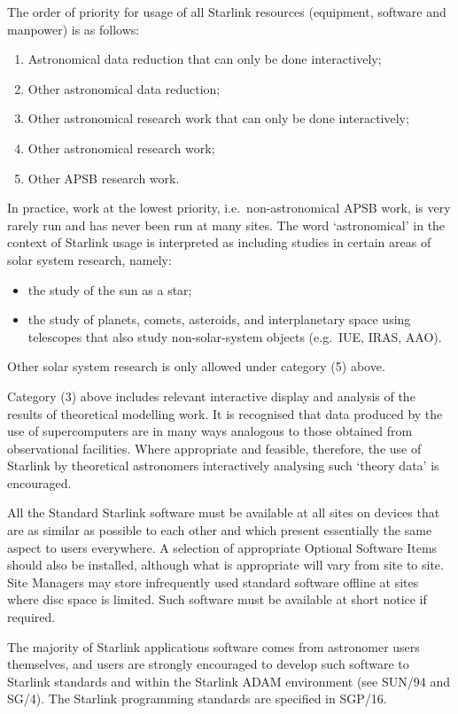 The order of priority for usage of all Starlink resources (equipment, software
and manpower) is as follows:
\begin{enumerate}
\item Astronomical data reduction that can only be done interactively;
\item Other astronomical data reduction;
\item Other astronomical research work that can only be done interactively;
\item Other astronomical research work;
\item Other APSB research work.
\end{enumerate}
In practice, work at the lowest priority, i.e.\ non-astronomical APSB work, is
very rarely run and has never been run at many sites.
The word `astronomical' in the context of Starlink usage is interpreted as
including studies in certain areas of solar system research, namely:
\begin{itemize}
\item the study of the sun as a star;
\item the study of planets, comets, asteroids, and interplanetary space using
telescopes that also study non-solar-system objects (e.g.\ IUE, IRAS, AAO).
\end{itemize}
Other solar system research is only allowed under category (5) above.

Category (3) above includes relevant interactive display and analysis of the
results of theoretical modelling work.
It is recognised that data produced by the use of supercomputers are in many
ways analogous to those obtained from observational facilities.
Where appropriate and feasible, therefore, the use of Starlink by theoretical
astronomers interactively analysing such `theory data' is encouraged.

All the Standard Starlink software must be available at all sites on devices
that are as similar as possible to each other and which present essentially the
same aspect to users everywhere.
A selection of appropriate Optional Software Items should also be installed,
although what is appropriate will vary from site to site.
Site Managers may store infrequently used standard software offline at sites
where disc space is limited.
Such software must be available at short notice if required.

The majority of Starlink applications software comes from astronomer users
themselves, and users are strongly encouraged to develop such software to
Starlink standards and within the Starlink ADAM environment (see SUN/94 and
SG/4).
The Starlink programming standards are specified in SGP/16.


